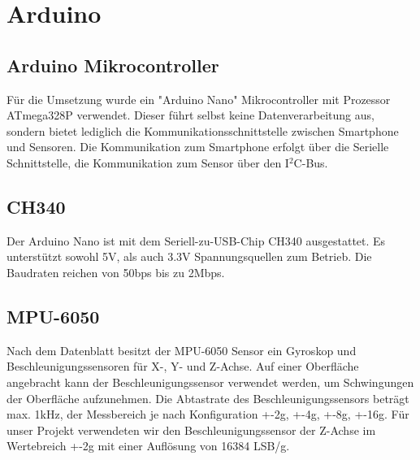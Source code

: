 \section{Arduino}

\subsection*{Arduino Mikrocontroller}
Für die Umsetzung wurde ein "Arduino Nano" Mikrocontroller mit Prozessor ATmega328P verwendet. Dieser führt selbst keine Datenverarbeitung aus, sondern bietet lediglich die Kommunikationsschnittstelle zwischen Smartphone und Sensoren. Die Kommunikation zum Smartphone erfolgt über die Serielle Schnittstelle, die Kommunikation zum Sensor über den I$^2$C-Bus. 


\subsection*{CH340}
Der Arduino Nano ist mit dem  Seriell-zu-USB-Chip CH340 ausgestattet.
Es unterstützt sowohl 5V, als auch 3.3V Spannungsquellen zum Betrieb.
Die Baudraten reichen von 50bps bis zu 2Mbps.


\subsection*{MPU-6050}
Nach dem Datenblatt \cite{MPU6050} besitzt der MPU-6050 Sensor ein Gyroskop und Beschleunigungssensoren für X-, Y- und Z-Achse.
Auf einer Oberfläche angebracht kann der Beschleunigungssensor verwendet werden, um Schwingungen der Oberfläche aufzunehmen.
Die Abtastrate des Beschleunigungssensors beträgt max. 1kHz, der Messbereich je nach Konfiguration +-2g, +-4g, +-8g, +-16g.
Für unser Projekt verwendeten wir den Beschleunigungssensor der Z-Achse im Wertebreich +-2g mit einer Auflösung von 16384 LSB/g.
